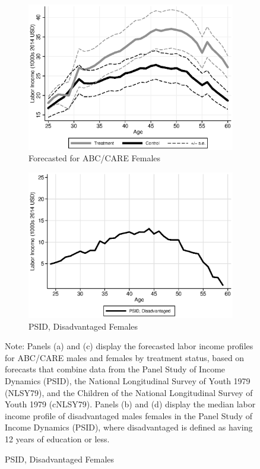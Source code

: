 \begin{figure}
\begin{subfigure}[h]{0.4\textwidth}
		\centering
		\caption{Forecasted for ABC/CARE Females} \label{fig:abcare0}
		\includegraphics[width=\textwidth]{output/labor_25-60_female.eps}
\end{subfigure}%
\begin{subfigure}[h]{0.4\textwidth}
	\centering
	\caption{PSID, Disadvantaged Females} \label{fig:psid0}
		\includegraphics[width=\textwidth]{output/psid_incomeprofiles_s0.eps}
\end{subfigure}
\footnotesize \justify
Note: Panels (a) and (c) display the forecasted labor income profiles for ABC/CARE males and females by treatment status, based on forecasts that combine data from the Panel Study of Income Dynamics (PSID), the National Longitudinal Survey of Youth 1979 (NLSY79), and the Children of the National Longitudinal Survey of Youth 1979 (cNLSY79). Panels (b) and (d) display the median labor income profile of disadvantaged males females in the Panel Study of Income Dynamics (PSID), where disadvantaged is defined as having 12 years of education or less.
\end{figure}


